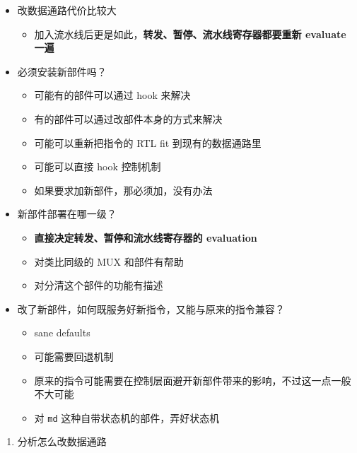 \documentclass[12pt,AutoFakeBold,AutoFakeSlant]{article}
\providecommand{\tightlist}{%
  \setlength{\itemsep}{0pt}\setlength{\parskip}{0pt}}
\begin{document}
\begin{itemize}
\tightlist
\item
  改数据通路代价比较大

  \begin{itemize}
  \tightlist
  \item
    加入流水线后更是如此，\textbf{转发、暂停、流水线寄存器都要重新
    evaluate 一遍}
  \end{itemize}
\item
  必须安装新部件吗？

  \begin{itemize}
  \tightlist
  \item
    可能有的部件可以通过 hook 来解决
  \item
    有的部件可以通过改部件本身的方式来解决
  \item
    可能可以重新把指令的 RTL fit 到现有的数据通路里
  \item
    可能可以直接 hook 控制机制
  \item
    如果要求加新部件，那必须加，没有办法
  \end{itemize}
\item
  新部件部署在哪一级？

  \begin{itemize}
  \tightlist
  \item
    \textbf{直接决定转发、暂停和流水线寄存器的 evaluation}
  \item
    对类比同级的 MUX 和部件有帮助
  \item
    对分清这个部件的功能有描述
  \end{itemize}
\item
  改了新部件，如何既服务好新指令，又能与原来的指令兼容？

  \begin{itemize}
  \tightlist
  \item
    sane defaults
  \item
    可能需要回退机制
  \item
    原来的指令可能需要在控制层面避开新部件带来的影响，不过这一点一般不大可能
  \item
    对 \texttt{md} 这种自带状态机的部件，弄好状态机
  \end{itemize}
\end{itemize}

\begin{enumerate}
\def\labelenumi{\arabic{enumi}.}
\setcounter{enumi}{1}
\tightlist
\item
  分析怎么改数据通路
\end{enumerate}
\end{document}
